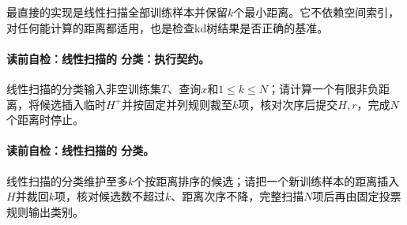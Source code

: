 \label{struct:V2-C02-CH10}
最直接的实现是线性扫描全部训练样本并保留$k$个最小距离。它不依赖空间索引，对任何能计算的距离都适用，也是检查kd树结果是否正确的基准。

\paragraph{读前自检：线性扫描的 分类：执行契约。}线性扫描的\kNN{}分类输入非空训练集$T$、查询$x$和$1\le k\le N$；请计算一个有限非负距离，将候选插入临时$H^+$并按固定并列规则裁至$k$项，核对次序后提交$H,r$，完成$N$个距离时停止。\par
\paragraph{读前自检：线性扫描的 分类。}线性扫描的\kNN{}分类维护至多$k$个按距离排序的候选；请把一个新训练样本的距离插入$H$并裁回$k$项，核对候选数不超过$k$、距离次序不降，完整扫描$N$项后再由固定投票规则输出类别。\par

